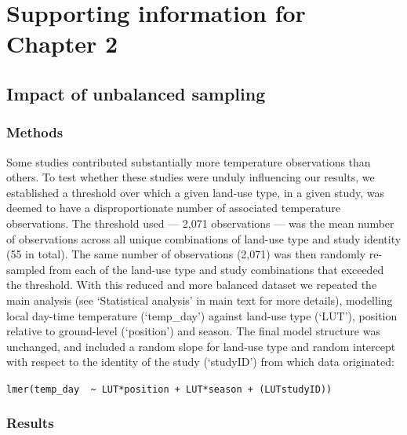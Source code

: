 \documentclass[12pt,a4paper,]{report}
\theoremstyle{definition}
\theoremstyle{definition}
\theoremstyle{definition}
\theoremstyle{remark}
\begin{document}
\clearpage
{}

\appendix


\chapter{Supporting information for Chapter
2}\label{supporting-information-for-chapter-2}

\section{Impact of unbalanced sampling}\label{text-A-1}

\subsection{Methods}\label{methods-3}

Some studies contributed substantially more temperature observations
than others. To test whether these studies were unduly influencing our
results, we established a threshold over which a given land-use type, in
a given study, was deemed to have a disproportionate number of
associated temperature observations. The threshold used --- 2,071
observations --- was the mean number of observations across all unique
combinations of land-use type and study identity (55 in total). The same
number of observations (2,071) was then randomly re-sampled from each of
the land-use type and study combinations that exceeded the threshold.
With this reduced and more balanced dataset we repeated the main
analysis (see `Statistical analysis' in main text for more details),
modelling local day-time temperature (`temp\_day') against land-use type
(`LUT'), position relative to ground-level (`position') and season. The
final model structure was unchanged, and included a random slope for
land-use type and random intercept with respect to the identity of the
study (`studyID') from which data originated:

\texttt{lmer(temp\_day\ \ \textasciitilde{}\ LUT*position\ +\ LUT*season\ +\ (LUT\textbar{}studyID))}

\subsection{Results}\label{results-4}
\end{document}
